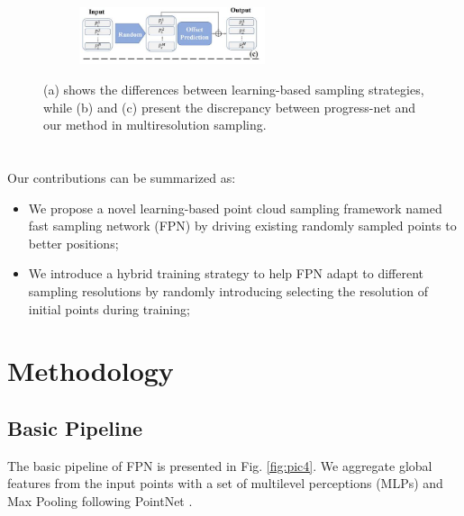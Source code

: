 \documentclass[review]{article}
\begin{document}
\begin{multicols}{2}
\begin{figure}[H]
\begin{subfigure}[b]{0.6\textwidth}
     \end{subfigure}
    
     \begin{subfigure}[b]{0.6\textwidth}
         \centering
         \includegraphics[width=0.6\textwidth]{pic3.jpg}
         
     \end{subfigure}
        \caption{(a) shows the differences between learning-based sampling strategies, while
(b) and (c) present the discrepancy between progress-net and our method in multiresolution sampling.}
        \label{fig:three_graphs}
    \end{figure}



\section*{}
Our
contributions can be summarized as:
\begin{itemize}
  \item We propose a novel learning-based point cloud sampling
framework named fast sampling network (FPN) by driving existing randomly sampled points to better positions;

  \item We introduce a hybrid training strategy to help FPN adapt to
different sampling resolutions by randomly introducing selecting the resolution of initial points during training;
  
\end{itemize}
\end{multicols}
\section{Methodology}
\subsection{Basic Pipeline}
The basic pipeline of FPN is presented in Fig. \ref{fig:pic4}. We aggregate
global features from the input points with a set of multilevel perceptions (MLPs) and Max Pooling following PointNet \cite{qi2017pointnet}.
\end{document}
